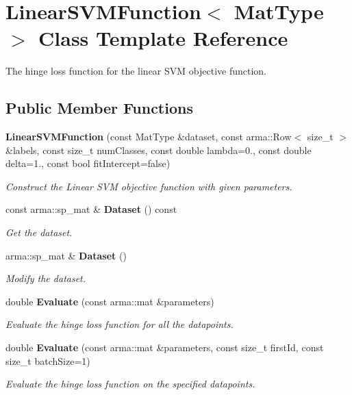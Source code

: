 \section{Linear\+S\+V\+M\+Function$<$ Mat\+Type $>$ Class Template Reference}
\label{classmlpack_1_1svm_1_1LinearSVMFunction}


The hinge loss function for the linear S\+VM objective function.  


\subsection*{Public Member Functions}
\begin{DoxyCompactItemize}
\item 
\textbf{ Linear\+S\+V\+M\+Function} (const Mat\+Type \&dataset, const arma\+::\+Row$<$ size\+\_\+t $>$ \&labels, const size\+\_\+t num\+Classes, const double lambda=0., const double delta=1., const bool fit\+Intercept=false)
\begin{DoxyCompactList}\small\item\em Construct the Linear S\+VM objective function with given parameters. \end{DoxyCompactList}\item 
const arma\+::sp\+\_\+mat \& \textbf{ Dataset} () const
\begin{DoxyCompactList}\small\item\em Get the dataset. \end{DoxyCompactList}\item 
arma\+::sp\+\_\+mat \& \textbf{ Dataset} ()
\begin{DoxyCompactList}\small\item\em Modify the dataset. \end{DoxyCompactList}\item 
double \textbf{ Evaluate} (const arma\+::mat \&parameters)
\begin{DoxyCompactList}\small\item\em Evaluate the hinge loss function for all the datapoints. \end{DoxyCompactList}\item 
double \textbf{ Evaluate} (const arma\+::mat \&parameters, const size\+\_\+t first\+Id, const size\+\_\+t batch\+Size=1)
\begin{DoxyCompactList}\small\item\em Evaluate the hinge loss function on the specified datapoints. \end{DoxyCompactList}\item 

\end{DoxyCompactItemize}
